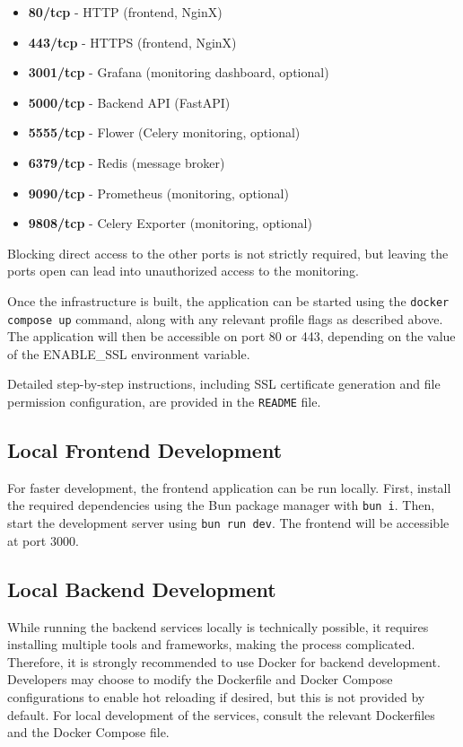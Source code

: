 \begin{itemize}
    \item \textbf{80/tcp} - HTTP (frontend, NginX)
    \item \textbf{443/tcp} - HTTPS (frontend, NginX)
    \item \textbf{3001/tcp} - Grafana (monitoring dashboard, optional)
    \item \textbf{5000/tcp} - Backend API (FastAPI)
    \item \textbf{5555/tcp} - Flower (Celery monitoring, optional)
    \item \textbf{6379/tcp} - Redis (message broker)
    \item \textbf{9090/tcp} - Prometheus (monitoring, optional)
    \item \textbf{9808/tcp} - Celery Exporter (monitoring, optional)
\end{itemize}

Blocking direct access to the other ports is not strictly required, but leaving the ports open can lead into unauthorized access to the monitoring.

Once the infrastructure is built, the application can be started using the \lstinline|docker compose up| command, along with any relevant profile flags as described above. The application will then be accessible on port 80 or 443, depending on the value of the ENABLE\_SSL environment variable.

Detailed step-by-step instructions, including SSL certificate generation and file permission configuration, are provided in the \lstinline|README| file.

\subsection{Local Frontend Development}
\label{sec:local-frontend-development}

For faster development, the frontend application can be run locally. First, install the required dependencies using the Bun package manager with \lstinline|bun i|. Then, start the development server using \lstinline|bun run dev|. The frontend will be accessible at port 3000.

\subsection{Local Backend Development}
\label{sec:local-backend-development}

While running the backend services locally is technically possible, it requires installing multiple tools and frameworks, making the process complicated. Therefore, it is strongly recommended to use Docker for backend development. Developers may choose to modify the Dockerfile and Docker Compose configurations to enable hot reloading if desired, but this is not provided by default. For local development of the services, consult the relevant Dockerfiles and the Docker Compose file.
